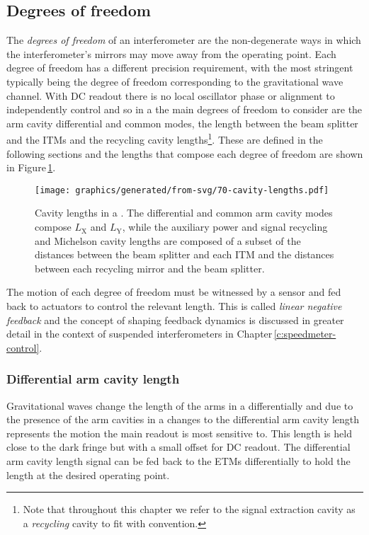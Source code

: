\subsection{\label{sec:dofs-of-drfpmi}Degrees of freedom}
The \emph{degrees of freedom} of an interferometer are the non-degenerate ways in which the interferometer's mirrors may move away from the operating point. Each degree of freedom has a different precision requirement, with the most stringent typically being the degree of freedom corresponding to the gravitational wave channel. With \gls{DC} readout there is no local oscillator phase or alignment to independently control and so in a \DRFPMI{} the main degrees of freedom to consider are the arm cavity differential and common modes, the length between the beam splitter and the \glspl{ITM} and the recycling cavity lengths\footnote{Note that throughout this chapter we refer to the signal extraction cavity as a \emph{recycling} cavity to fit with convention.}. These are defined in the following sections and the lengths that compose each degree of freedom are shown in Figure\,\ref{fig:et-lf-cavity-lengths}.

\begin{figure}
  \centering
  \texttt{[image: graphics/generated/from-svg/70-cavity-lengths.pdf]}
  \caption[Cavity lengths in a \DRFPMI{}]{\label{fig:et-lf-cavity-lengths}Cavity lengths in a \DRFPMI{}. The differential and common arm cavity modes compose $L_{\text{X}}$ and $L_{\text{Y}}$, while the auxiliary power and signal recycling and Michelson cavity lengths are composed of a subset of the distances between the beam splitter and each \gls{ITM} and the distances between each recycling mirror and the beam splitter.}
\end{figure}

The motion of each degree of freedom must be witnessed by a sensor and fed back to actuators to control the relevant length. This is called \emph{linear negative feedback} and the concept of shaping feedback dynamics is discussed in greater detail in the context of suspended interferometers in Chapter\,\ref{c:speedmeter-control}.

\subsubsection{Differential arm cavity length}
Gravitational waves change the length of the arms in a \MI{} differentially and due to the presence of the arm cavities in a \DRFPMI{} changes to the differential arm cavity length represents the motion the main readout is most sensitive to. This length is held close to the dark fringe but with a small offset for \gls{DC} readout. The differential arm cavity length signal can be fed back to the \glspl{ETM} differentially to hold the length at the desired operating point.

